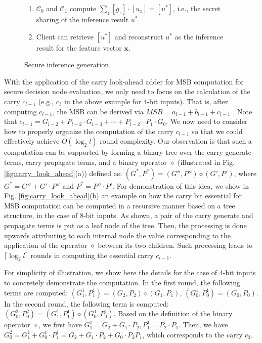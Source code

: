 \documentclass[10pt,journal,compsoc]{IEEEtran}
\begin{document}
\begin{figure*}[!t]
{\begin{minipage} [t]{0.8\textwidth}
\begin{enumerate}[1:]



\item $\mathcal{C}_0$ and $\mathcal{C}_1$ compute $\sum\nolimits_z{[g_z]\cdot [u_z]}=[u^*]$, i.e., the secret sharing of the inference result $u^*$.



\item Client can retrieve $[u^*]$ and reconstruct $u^*$ as the inference result for the feature vector $\mathbf{x}$.

\end{enumerate}
\end{minipage}
}
%
\caption{Secure inference generation.}
\label{fig:polynomial-secure-classification-gen}
\end{figure*}


With the application of the carry look-ahead adder for MSB computation for secure decision node evaluation, we only need to focus on the calculation of the carry $c_{l-1}$ (e.g., $c_3$ in the above example for $4$-bit inputs).
%
That is, after computing $c_{l-1}$, the MSB can be derived via $MSB=a_{l-1}+b_{l-1}+c_{l-1}$ .
%
Note that $c_{l-1}=G_{l-2}+P_{l-2}\cdot G_{l-3}+\cdots +P_{l-2}\cdots P_{1}\cdot G_0$.
%
We now need to consider how to properly organize the computation of the carry $c_{l-1}$ so that we could effectively achieve $O(\log_2 l)$ round complexity.  
%
Our observation is that such a computation can be supported by forming a binary tree over the carry generate terms, carry propagate terms, and a binary operator $\diamond$ (illustrated in Fig. \ref{fig:carry_look_ahead}(a)) defined as: $(G^*,P^*)=(G'',P'')\diamond (G',P')$, where $G^*=G''+G'\cdot P''$ and $P^*=P''\cdot P'$.
%
For demonstration of this idea, we show in Fig. \ref{fig:carry_look_ahead}(b) an example on how the carry bit essential for MSB computation can be computed in a recursive manner based on a tree structure, in the case of $8$-bit inputs.
%
As shown, a pair of the carry generate and propagate terms is put as a leaf node of the tree.
%
Then, the processing is done upwards attributing to each internal node the value corresponding to the application of the operator $\diamond$ between its two children.
%
Such processing leads to $\lceil{\log_2 l}\rceil$ rounds in computing the essential carry $c_{l-1}$.

For simplicity of illustration, we show here the details for the case of $4$-bit inputs to concretely demonstrate the computation.
%
In the first round, the following terms are computed: $(G^1_1,P^1_1)=(G_2,P_2)\diamond (G_1,P_1)$, $(G^1_0,P^1_0)=(G_0,P_0)$.
%
In the second round, the following term is computed: $(G^2_0, P^2_0)=(G^1_1,P^1_1)\diamond (G^1_0,P^1_0)$.
%
Based on the definition of the binary operator $\diamond$, we first have $G^1_1=G_2+G_1\cdot P_2,P^1_1=P_2\cdot P_1$.
%
Then, we have $G^2_0=G^1_1+G^1_0\cdot P^1_1=G_2+G_1\cdot P_2+G_0\cdot P_2P_1$, which corresponds to the carry $c_3$.
%
\end{document}
